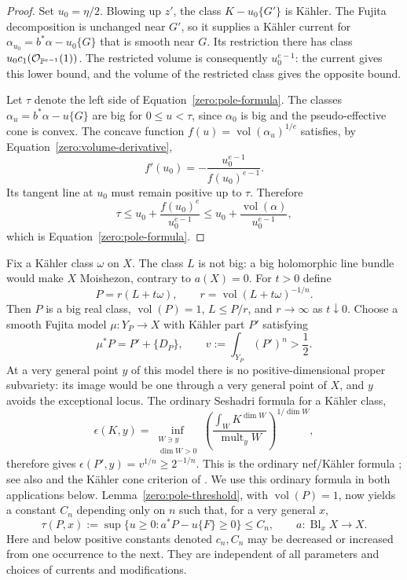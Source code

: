 \begin{proof}
Set \(u_0=\eta/2\).  Blowing up \(z'\), the class
\(K-u_0\{G'\}\) is Kähler.  The Fujita decomposition is unchanged near
\(G'\), so it supplies a Kähler current for
\(\alpha_{u_0}=b^*\alpha-u_0\{G\}\) that is smooth near \(G\).
Its restriction there has class \(u_0c_1(\mathcal O_{\mathbb{P}^{e-1}}(1))\).
The restricted volume is consequently \(u_0^{e-1}\): the current gives
this lower bound, and the volume of the restricted class gives the
opposite bound.

Let \(\tau\) denote the left side of Equation~\eqref{zero:pole-formula}.  The classes
\(\alpha_u=b^*\alpha-u\{G\}\) are big for \(0\le u<\tau\), since
\(\alpha_0\) is big and the pseudo-effective cone is convex.  The
concave function \(f(u)=\operatorname{vol}(\alpha_u)^{1/e}\) satisfies, by
Equation~\eqref{zero:volume-derivative},
\[
 f'(u_0)=-\frac{u_0^{e-1}}{f(u_0)^{e-1}}.
\]
Its tangent line at \(u_0\) must remain positive up to \(\tau\).
Therefore
\[
 \tau\le u_0+\frac{f(u_0)^e}{u_0^{e-1}}
 \le u_0+\frac{\operatorname{vol}(\alpha)}{u_0^{e-1}},
\]
which is Equation~\eqref{zero:pole-formula}.
\end{proof}

Fix a Kähler class \(\omega\) on \(X\).  The class \(L\) is not big:
a big holomorphic line bundle would make \(X\) Moishezon, contrary to
\(a(X)=0\).  For \(t>0\) define
\begin{equation}\label{zero:normalization}
 P=r(L+t\omega),\qquad
 r=\operatorname{vol}(L+t\omega)^{-1/n}.
\end{equation}
Then \(P\) is a big real class, \(\operatorname{vol}(P)=1\), \(L\le P/r\), and
\(r\to\infty\) as \(t\downarrow0\).  Choose a smooth Fujita model
\(\mu:Y_P\to X\) with Kähler part \(P'\) satisfying
\begin{equation}\label{zero:P-prime}
 \mu^*P=P'+\{D_P\},\qquad v:=\int_{Y_P}(P')^n>\frac12.
\end{equation}
At a very general point \(y\) of this model there is no
positive-dimensional proper subvariety: its image would be one through a
very general point of \(X\), and \(y\) avoids the exceptional locus.
The ordinary Seshadri formula for a Kähler class,
\[
 \epsilon(K,y)
  =\inf_{\substack{W\ni y\\ \dim W>0}}
       \left(\frac{\int_W K^{\dim W}}
       {\operatorname{mult}_y W}\right)^{1/\dim W},
\]
therefore gives \(\epsilon(P',y)=v^{1/n}\ge2^{-1/n}\).
This is the ordinary nef/Kähler formula
\cite[Theorem~2.8]{Tosatti2016}; see also
\cite[Equation~(1.5)]{CollinsTosatti2018} and the
Kähler cone criterion of \cite{DemaillyPaun2004}.  We use this ordinary
formula in both applications below.  Lemma~\ref{zero:pole-threshold}, with
\(\operatorname{vol}(P)=1\), now yields a constant \(C_n\) depending only on \(n\)
such that, for a very general \(x\),
\begin{equation}\label{zero:point-bound}
 \tau(P,x):=\sup\{u\ge0:a^*P-u\{F\}\ge0\}\le C_n,
 \qquad a:\operatorname{Bl}_xX\to X.
\end{equation}
Here and below positive constants denoted \(c_n,C_n\) may be decreased or
increased from one occurrence to the next.  They are independent of all
parameters and choices of currents and modifications.


